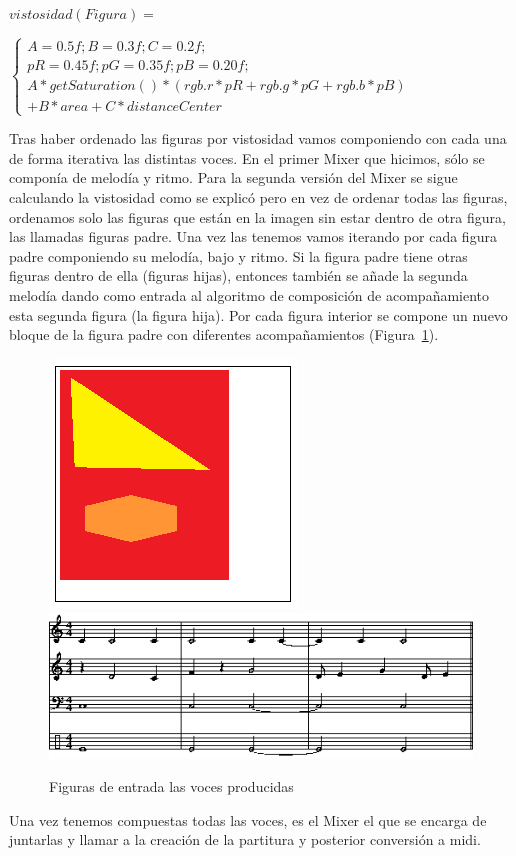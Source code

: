 	\begin{center}
		$vistosidad(Figura) =$
	\end{center}
	\begin{center}
		
		$\left\{
		\begin{array}{cc}
		A = 0.5f; B = 0.3f; C = 0.2f;\\ 
		pR = 0.45f; pG = 0.35f; pB = 0.20f;\\
		A*getSaturation()*(rgb.r*pR + rgb.g*pG + rgb.b*pB)\\
		 + B*area + C*distanceCenter
		\end{array}\right.$
	\end{center}

Tras haber ordenado las figuras por vistosidad vamos componiendo con cada una de forma iterativa las distintas voces. En el primer Mixer que hicimos, sólo se componía  de melodía y ritmo. Para la segunda versión del Mixer se sigue calculando la vistosidad como se explicó pero en vez de ordenar todas las figuras, ordenamos solo las figuras que están en la imagen sin estar dentro de otra figura, las llamadas figuras padre. Una vez las tenemos vamos iterando por cada figura padre componiendo su melodía, bajo y ritmo. Si la figura padre tiene otras figuras dentro de ella (figuras hijas), entonces también se añade la segunda melodía dando como entrada al algoritmo de composición de acompañamiento esta segunda figura (la figura hija). Por cada figura interior se compone un nuevo bloque de la figura padre con diferentes acompañamientos (Figura~\ref{fig:Figura1Mixer}).

		\begin{figure}[htbp]
		\centering
		\hspace*{0.0in}
		\includegraphics[scale=1]{graphics/simpletest5.png}
		\includegraphics[scale=1]{graphics/simpletest5-partitura.png}
		\caption{Figuras de entrada las voces producidas}
		\label{fig:Figura1Mixer}
		\end{figure}

Una vez tenemos compuestas todas las voces, es el Mixer el que se encarga de juntarlas y llamar a la creación de la partitura y posterior conversión a midi.
